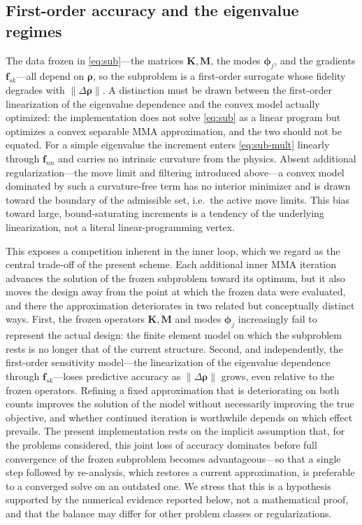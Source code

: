 \documentclass[11pt]{article}
\newcommand{\rhov}{\bm{\rho}}
\newcommand{\Krho}{\mathbf{K}}
\newcommand{\Mrho}{\mathbf{M}}
\newcommand{\phiv}{\bm{\phi}}
\newcommand{\fv}{\mathbf{f}}
\begin{document}
\subsection{First-order accuracy and the eigenvalue regimes}

The data frozen in \eqref{eq:sub}---the matrices $\Krho,\Mrho$, the modes
$\phiv_j$, and the gradients $\fv_{sk}$---all depend on $\rhov$, so the
subproblem is a first-order surrogate whose fidelity degrades with
$\|\Delta\rhov\|$. A distinction must be drawn between the first-order
linearization of the eigenvalue dependence and the convex model actually
optimized: the implementation does not solve \eqref{eq:sub} as a linear
program but optimizes a convex separable MMA approximation, and the two
should not be equated. For a simple eigenvalue the increment enters
\eqref{eq:sub-mult} linearly through $\fv_{nn}$ and carries no intrinsic
curvature from the physics. Absent additional regularization---the move
limit and filtering introduced above---a convex model dominated by such a
curvature-free term has no interior minimizer and is drawn toward the
boundary of the admissible set, i.e.\ the active move limits. This bias
toward large, bound-saturating increments is a tendency of the underlying
linearization, not a literal linear-programming vertex.

This exposes a competition inherent in the inner loop, which we regard as
the central trade-off of the present scheme. Each additional inner MMA
iteration advances the solution of the frozen subproblem toward its optimum,
but it also moves the design away from the point at which the frozen data
were evaluated, and there the approximation deteriorates in two related but
conceptually distinct ways. First, the frozen operators $\Krho,\Mrho$ and
modes $\phiv_j$ increasingly fail to represent the actual design: the finite
element model on which the subproblem rests is no longer that of the current
structure. Second, and independently, the first-order sensitivity model---the
linearization of the eigenvalue dependence through $\fv_{sk}$---loses
predictive accuracy as $\|\Delta\rhov\|$ grows, even relative to the frozen
operators. Refining a fixed approximation that is deteriorating on both
counts improves the solution of the model without necessarily improving the
true objective, and whether continued iteration is worthwhile depends on
which effect prevails. The present implementation rests on the implicit
assumption that, for the problems considered, this joint loss of accuracy
dominates before full convergence of the frozen subproblem becomes
advantageous---so that a single step followed by re-analysis, which restores
a current approximation, is preferable to a converged solve on an outdated
one. We stress that this is a hypothesis supported by the numerical evidence
reported below, not a mathematical proof, and that the balance may differ
for other problem classes or regularizations.
\end{document}
